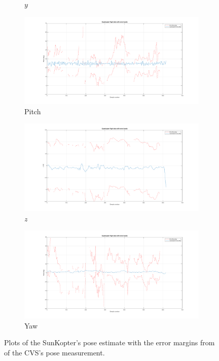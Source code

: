 \begin{figure}
\begin{subfigure}{0.45\textwidth}
    \caption{$y$}
  \end{subfigure}
  \begin{subfigure}{0.45\textwidth}
    \includegraphics[clip, trim = 150 0 120 0, width=\textwidth]{figures/chapter5/pitch}
    \caption{Pitch}
  \end{subfigure}
  \begin{subfigure}{0.45\textwidth}
    \includegraphics[clip, trim = 150 0 120 0, width=\textwidth]{figures/chapter5/z}
    \caption{$z$}
  \end{subfigure}
  \begin{subfigure}{0.45\textwidth}
    \includegraphics[clip, trim = 150 0 120 0, width=\textwidth]{figures/chapter5/yaw}
    \caption{Yaw}
  \end{subfigure}
  \caption[Plots of the SunKopter's flight and measurement errors.]{Plots of the SunKopter's pose estimate with the error margins from of the CVS's pose measurement. }
  \label{fig:chap5-results}
\end{figure}

